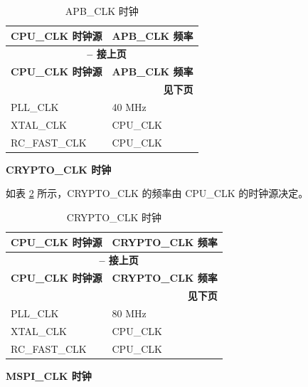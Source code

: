 \documentclass[main\_\_CN.tex]{subfiles}
\begin{document}
 \begin{longtable}[c]{ |p{5cm}|p{5cm}| }
      \caption{APB\_CLK 时钟}
    \label{table:apb_clk_src} \\
        \hline
        \rowcolor{lightgray}
            \textbf{CPU\_CLK 时钟源} & \textbf{APB\_CLK 频率} \\\hline
        \endfirsthead

        \multicolumn{2}{c}{\bfseries \tablename\ \thetable{} -- 接上页}\\\hline
        \rowcolor{lightgray}
        \textbf{CPU\_CLK 时钟源} & \textbf{APB\_CLK 频率} \\\hline
        \endhead
        \multicolumn{2}{r}{\textbf{见下页}} \\
        \endfoot
        \endlastfoot
        \hline
        PLL\_CLK & 40 MHz \\
        \hline
        XTAL\_CLK & CPU\_CLK \\
        \hline
        RC\_FAST\_CLK & CPU\_CLK \\
        \hline
\end{longtable}


\textbf{CRYPTO\_CLK 时钟}

如表 \ref{tab:resclk-crypto-clk-freq} 所示，CRYPTO\_CLK 的频率由 CPU\_CLK 的时钟源决定。

 \begin{longtable}[c]{ |p{5cm}|p{5cm}| }
      \caption{CRYPTO\_CLK 时钟}
    \label{tab:resclk-crypto-clk-freq} \\
        \hline
    \rowcolor{lightgray}
        \textbf{CPU\_CLK 时钟源} & \textbf{CRYPTO\_CLK 频率} \\
        \hline
        \endfirsthead
        \multicolumn{2}{c}{\bfseries \tablename\ \thetable{} -- 接上页}\\\hline

    \rowcolor{lightgray}
        \textbf{CPU\_CLK 时钟源} & \textbf{CRYPTO\_CLK 频率} \\\hline
        \endhead
        \multicolumn{2}{r}{\textbf{见下页}} \\
        \endfoot
        \endlastfoot
        \hline
        PLL\_CLK & 80 MHz \\
        \hline
        XTAL\_CLK & CPU\_CLK \\
        \hline
        RC\_FAST\_CLK & CPU\_CLK \\
        \hline
\end{longtable}

\textbf{MSPI\_CLK 时钟}
\end{document}
